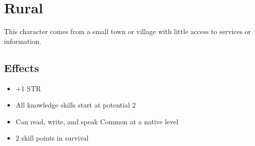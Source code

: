 \section{Rural}\label{culture:rural}
This character comes from a small town or village with little access to
services or information.

\subsection*{Effects}
\begin{itemize}
    \item +1 STR
    \item All knowledge skills start at potential 2
    \item Can read, write, and speak Common at a native level
    \item 2 skill points in survival
\end{itemize}
